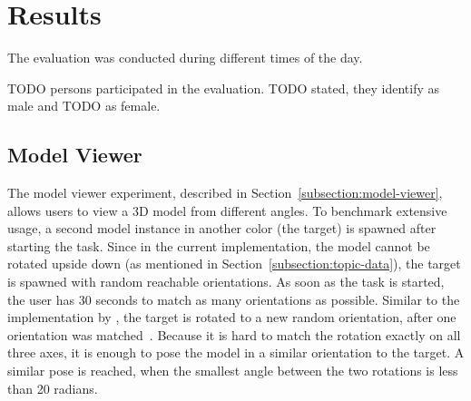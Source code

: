 \section{Results}\label{section:eval-results}


\newcommand{\evalExpMvAvgPoses}{3.255} %
\newcommand{\evalExpMvStdPoses}{2.284}
\newcommand{\evalExpMvParticipants}{12}

\newcommand{\evalExpMvSusScore}{82}
\newcommand{\evalExpMvSusGrade}{B}
\newcommand{\evalExpMvSusAdj}{Good}

\newcommand{\evalExpLpSusScore}{82}
\newcommand{\evalExpLpSusGrade}{B}
\newcommand{\evalExpLpSusAdj}{Good}

\newcommand{\evalExpVkSusScore}{82}
\newcommand{\evalExpVkSusGrade}{B}
\newcommand{\evalExpVkSusAdj}{Good}




The evaluation was conducted during different times of the day. %


TODO persons participated in the evaluation. TODO stated, they identify as male and TODO as female. 

\subsection{Model Viewer}\label{section:eval-res-mv}

The model viewer experiment, described in Section~\ref{subsection:model-viewer}, allows users to view a \ac{3D} model from different angles. To benchmark extensive usage, a second model instance in another color (the target) is spawned after starting the task. Since in the current implementation, the model cannot be rotated upside down (as mentioned in Section~\ref{subsection:topic-data}), the target is spawned with random reachable orientations.
As soon as the task is started, the user has 30 seconds to match as many orientations as possible. Similar to the implementation by \citeauthor{Katzakis.2010}, the target is rotated to a new random orientation, after one orientation was matched~\cite[140]{Katzakis.2010}.
Because it is hard to match the rotation exactly on all three axes, it is enough to pose the model in a similar orientation to the target. A similar pose is reached, when the smallest angle between the two rotations is less than 20 radians.

